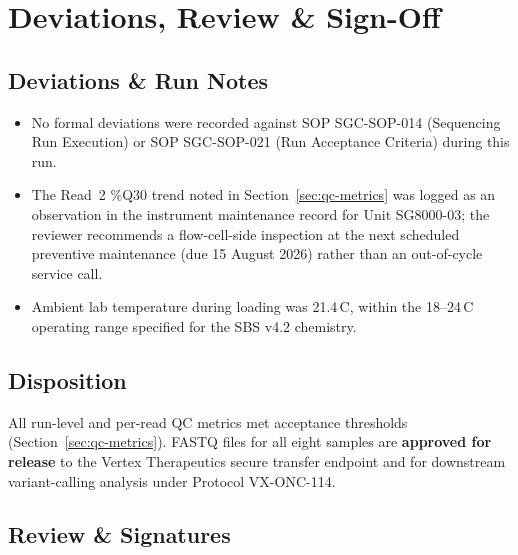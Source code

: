 
\section{Deviations, Review \& Sign-Off}
\label{sec:sign-off}

\subsection{Deviations \& Run Notes}

\begin{itemize}[leftmargin=1.4em, itemsep=3pt]
  \item No formal deviations were recorded against SOP SGC-SOP-014 (Sequencing Run Execution)
  or SOP SGC-SOP-021 (Run Acceptance Criteria) during this run.
  \item The Read~2 \%Q30 trend noted in Section~\ref{sec:qc-metrics} was logged as an
  observation in the instrument maintenance record for Unit SG8000-03; the reviewer
  recommends a flow-cell-side inspection at the next scheduled preventive maintenance
  (due 15 August 2026) rather than an out-of-cycle service call.
  \item Ambient lab temperature during loading was 21.4\,\textdegree C, within the 18--24\,\textdegree C
  operating range specified for the SBS v4.2 chemistry.
\end{itemize}

\subsection{Disposition}

\begin{infobox}
All run-level and per-read QC metrics met acceptance thresholds (Section~\ref{sec:qc-metrics}).
FASTQ files for all eight samples are \textbf{approved for release} to the Vertex Therapeutics
secure transfer endpoint and for downstream variant-calling analysis under Protocol
VX-ONC-114.
\end{infobox}

\subsection{Review \& Signatures}

